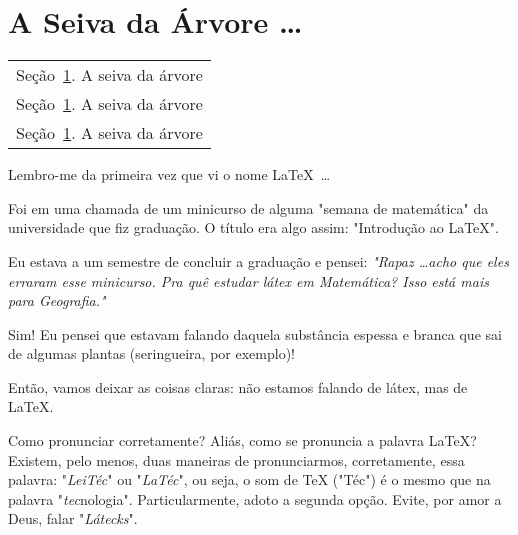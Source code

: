 \section{A Seiva da Árvore \ldots}\label{sec:seiva} %

\begin{margintable}\vspace{.8in}\footnotesize
  \begin{tabularx}{\marginparwidth}{|X}
    Seção~\ref{sec:seiva}. A seiva da árvore\\
    Seção~\ref{sec:seiva}. A seiva da árvore\\
    Seção~\ref{sec:seiva}. A seiva da árvore\\
  \end{tabularx}
\end{margintable}

Lembro-me da primeira vez que vi o nome \LaTeX\ \ldots

Foi em uma chamada de um minicurso de alguma "semana de matemática" da 
universidade que fiz graduação.
O título era algo assim: "Introdução ao \LaTeX".

Eu estava a um semestre de concluir a graduação e pensei: 
\textit{
  "Rapaz \ldots acho que eles erraram esse minicurso. 
  Pra quê estudar látex em Matemática? 
  Isso está mais para Geografia."
}


Sim! 
Eu pensei que estavam falando daquela substância espessa e branca que sai de 
algumas plantas (seringueira, por exemplo)!

Então, vamos deixar as coisas claras: não estamos falando de látex, mas de \LaTeX.

\begin{atencao}{Como pronunciar corretamente?}{\exclamacao}
  Aliás, como se pronuncia a palavra \LaTeX?\\
  Existem, pelo menos, duas maneiras de pronunciarmos, corretamente, essa palavra:
  "\textit{LeiTéc}" ou "\textit{LaTéc}", ou seja, o som de \TeX{} ("Téc") é o 
  mesmo que na palavra "\textit{tec}nologia". 
  Particularmente, adoto a segunda opção.
  Evite, por amor a Deus, falar "\textit{Látecks}".
\end{atencao}


